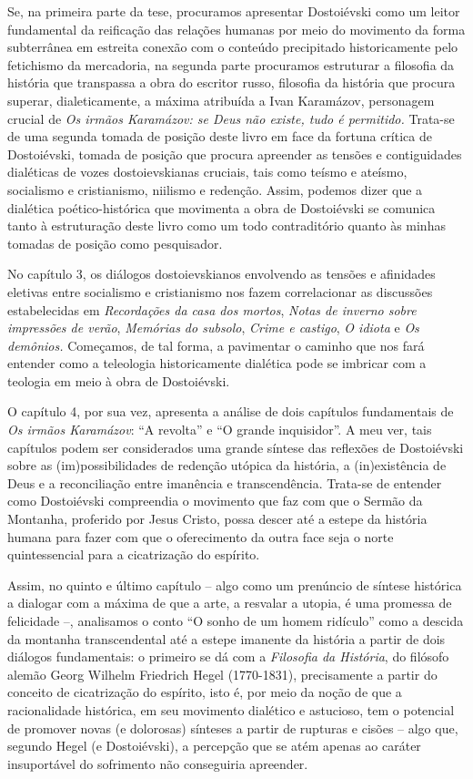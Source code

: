 Se, na primeira parte da tese, procuramos apresentar Dostoiévski como um
leitor fundamental da reificação das relações humanas por meio do
movimento da forma subterrânea em estreita conexão com o conteúdo
precipitado historicamente pelo fetichismo da mercadoria, na segunda
parte procuramos estruturar a filosofia da história que transpassa a
obra do escritor russo, filosofia da história que procura superar,
dialeticamente, a máxima atribuída a Ivan Karamázov, personagem crucial
de \emph{Os irmãos Karamázov: se Deus não existe, tudo é permitido.}
Trata-se de uma segunda tomada de posição deste livro em face da fortuna
crítica de Dostoiévski, tomada de posição que procura apreender as
tensões e contiguidades dialéticas de vozes dostoievskianas cruciais,
tais como teísmo e ateísmo, socialismo e cristianismo, niilismo e
redenção. Assim, podemos dizer que a dialética poético-histórica que
movimenta a obra de Dostoiévski se comunica tanto à estruturação deste
livro como um todo contraditório quanto às minhas tomadas de posição
como pesquisador.

No capítulo 3, os diálogos dostoievskianos envolvendo as tensões e
afinidades eletivas entre socialismo e cristianismo nos fazem
correlacionar as discussões estabelecidas em \emph{Recordações da casa
dos mortos}, \emph{Notas de inverno sobre impressões de verão},
\emph{Memórias do subsolo}, \emph{Crime e castigo}, \emph{O idiota} e
\emph{Os demônios.} Começamos, de tal forma, a pavimentar o caminho que
nos fará entender como a teleologia historicamente dialética pode se
imbricar com a teologia em meio à obra de Dostoiévski.

O capítulo 4, por sua vez, apresenta a análise de dois capítulos
fundamentais de \emph{Os irmãos Karamázov}: ``A revolta'' e ``O grande
inquisidor''. A meu ver, tais capítulos podem ser considerados uma
grande síntese das reflexões de Dostoiévski sobre as (im)possibilidades
de redenção utópica da história, a (in)existência de Deus e a
reconciliação entre imanência e transcendência. Trata-se de entender
como Dostoiévski compreendia o movimento que faz com que o Sermão da
Montanha, proferido por Jesus Cristo, possa descer até a estepe da
história humana para fazer com que o oferecimento da outra face seja o
norte quintessencial para a cicatrização do espírito.

Assim, no quinto e último capítulo -- algo como um prenúncio de síntese
histórica a dialogar com a máxima de que a arte, a resvalar a utopia, é
uma promessa de felicidade --, analisamos o conto ``O sonho de um homem
ridículo'' como a descida da montanha transcendental até a estepe
imanente da história a partir de dois diálogos fundamentais: o primeiro
se dá com a \emph{Filosofia da História}, do filósofo alemão Georg
Wilhelm Friedrich Hegel (1770-1831), precisamente a partir do conceito
de cicatrização do espírito, isto é, por meio da noção de que a
racionalidade histórica, em seu movimento dialético e astucioso, tem o
potencial de promover novas (e dolorosas) sínteses a partir de rupturas
e cisões -- algo que, segundo Hegel (e Dostoiévski), a percepção que se
atém apenas ao caráter insuportável do sofrimento não conseguiria
apreender.

